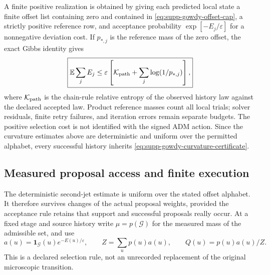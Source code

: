 \documentclass[11pt]{article}
\theoremstyle{definition}
\theoremstyle{remark}
\newcommand{\one}{\mathbf 1}
\begin{document}
A finite positive realization is obtained by giving each predicted local state
a finite offset list containing zero and contained in
\eqref{eq:supp-gowdy-offset-cap}, a strictly positive reference row, and
acceptance probability $\exp[-E_j/\varepsilon]$ for a nonnegative deviation
cost.  If $p_{*,j}$ is the reference mass of the zero offset, the exact Gibbs
identity gives
\begin{equation}
 \boxed{
 \mathbb E\sum_jE_j
 \le\varepsilon\left[
 \mathcal K_{\rm path}+\sum_j\log(1/p_{*,j})\right],}
 \label{eq:supp-gowdy-gibbs-bound}
\end{equation}
where $\mathcal K_{\rm path}$ is the chain-rule relative entropy of the observed
history law against the declared accepted law.  Product reference masses count
all local trials; solver residuals, finite retry failures, and iteration errors
remain separate budgets.  The positive selection cost is not identified with
the signed ADM action.  Since the curvature estimates above are deterministic
and uniform over the permitted alphabet, every successful history inherits
\eqref{eq:supp-gowdy-curvature-certificate}.

\subsection{Measured proposal access and finite execution}

The deterministic second-jet estimate is uniform over the stated offset
alphabet.  It therefore survives changes of the actual proposal weights,
provided the acceptance rule retains that support and successful proposals
really occur.  At a fixed stage and source history write
$\mu=p(\mathcal G)$ for the measured mass of the admissible set, and use
\[
 a(u)=\one_{\mathcal G}(u)e^{-E(u)/\varepsilon},\qquad
 Z=\sum_up(u)a(u),\qquad Q(u)=p(u)a(u)/Z.
\]
This is a declared selection rule, not an unrecorded replacement of the
original microscopic transition.
\end{document}
